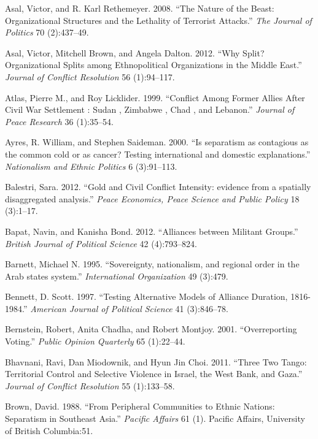 \documentclass[12pt,]{book}
\theoremstyle{definition}
\theoremstyle{definition}
\theoremstyle{definition}
\theoremstyle{remark}
\begin{document}
\leavevmode\hypertarget{ref-Asal2008}{}%
Asal, Victor, and R. Karl Rethemeyer. 2008. ``The Nature of the Beast:
Organizational Structures and the Lethality of Terrorist Attacks.''
\emph{The Journal of Politics} 70 (2):437--49.

\leavevmode\hypertarget{ref-Asal2012}{}%
Asal, Victor, Mitchell Brown, and Angela Dalton. 2012. ``Why Split?
Organizational Splits among Ethnopolitical Organizations in the Middle
East.'' \emph{Journal of Conflict Resolution} 56 (1):94--117.

\leavevmode\hypertarget{ref-Atlas1999}{}%
Atlas, Pierre M., and Roy Licklider. 1999. ``Conflict Among Former
Allies After Civil War Settlement : Sudan , Zimbabwe , Chad , and
Lebanon.'' \emph{Journal of Peace Research} 36 (1):35--54.

\leavevmode\hypertarget{ref-Ayres2000}{}%
Ayres, R. William, and Stephen Saideman. 2000. ``Is separatism as
contagious as the common cold or as cancer? Testing international and
domestic explanations.'' \emph{Nationalism and Ethnic Politics} 6
(3):91--113.

\leavevmode\hypertarget{ref-Balestri2012}{}%
Balestri, Sara. 2012. ``Gold and Civil Conflict Intensity: evidence from
a spatially disaggregated analysis.'' \emph{Peace Economics, Peace
Science and Public Policy} 18 (3):1--17.

\leavevmode\hypertarget{ref-Bapat2012}{}%
Bapat, Navin, and Kanisha Bond. 2012. ``Alliances between Militant
Groups.'' \emph{British Journal of Political Science} 42 (4):793--824.

\leavevmode\hypertarget{ref-Barnett1995}{}%
Barnett, Michael N. 1995. ``Sovereignty, nationalism, and regional order
in the Arab states system.'' \emph{International Organization} 49
(3):479.

\leavevmode\hypertarget{ref-Bennett1997}{}%
Bennett, D. Scott. 1997. ``Testing Alternative Models of Alliance
Duration, 1816-1984.'' \emph{American Journal of Political Science} 41
(3):846--78.

\leavevmode\hypertarget{ref-Bernstein2001}{}%
Bernstein, Robert, Anita Chadha, and Robert Montjoy. 2001.
``Overreporting Voting.'' \emph{Public Opinion Quarterly} 65 (1):22--44.

\leavevmode\hypertarget{ref-Bhavnani2011}{}%
Bhavnani, Ravi, Dan Miodownik, and Hyun Jin Choi. 2011. ``Three Two
Tango: Territorial Control and Selective Violence in Israel, the West
Bank, and Gaza.'' \emph{Journal of Conflict Resolution} 55 (1):133--58.

\leavevmode\hypertarget{ref-Brown1988a}{}%
Brown, David. 1988. ``From Peripheral Communities to Ethnic Nations:
Separatism in Southeast Asia.'' \emph{Pacific Affairs} 61 (1). Pacific
Affairs, University of British Columbia:51.
\end{document}
